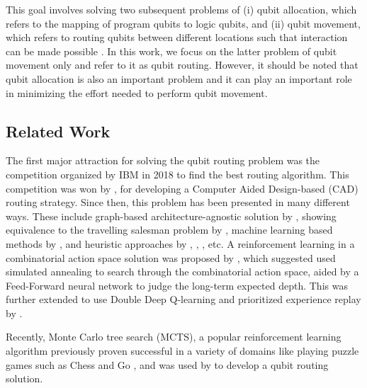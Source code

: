 This goal involves solving two subsequent problems of (i) qubit allocation, which refers to the mapping of program qubits to logic qubits, and (ii) qubit movement, which refers to routing qubits between different locations such that interaction can be made possible \cite{utk_qubit_noise}. In this work, we focus on the latter problem of qubit movement only and refer to it as qubit routing. However, it should be  noted that qubit allocation is also an important problem and it can play an important role in minimizing the effort needed to perform qubit movement.



\subsection{\label{sec:intro-related}Related Work}

The first major attraction for solving the qubit routing problem was the competition organized by IBM in 2018 to find the best routing algorithm. This competition was won by \cite{zulehner2018mapping}, for developing a Computer Aided Design-based (CAD) routing strategy. Since then, this problem has been presented in many different ways. These include graph-based architecture-agnostic solution by \cite{qroute_tket}, showing equivalence to the travelling salesman problem by \cite{paler_torus}, machine learning based methods by \cite{paler_ml}, and heuristic approaches by \cite{review-1}, \cite{review-2}, \cite{review-3}, etc. A reinforcement learning in a combinatorial action space solution was proposed by \cite{qroute_dqn1}, which suggested used simulated annealing to search through the combinatorial action space, aided by a Feed-Forward neural network to judge the long-term expected depth. This was further extended to use Double Deep Q-learning and prioritized experience replay by \cite{qroute_dqn2}. 

Recently, Monte Carlo tree search (MCTS), a popular reinforcement learning algorithm \cite{mcts_survey} previously proven successful in a variety of domains like playing puzzle games such as Chess and Go \cite{mcts_alphago}, and was used by \cite{qroute_mcts} to develop a qubit routing solution. 


